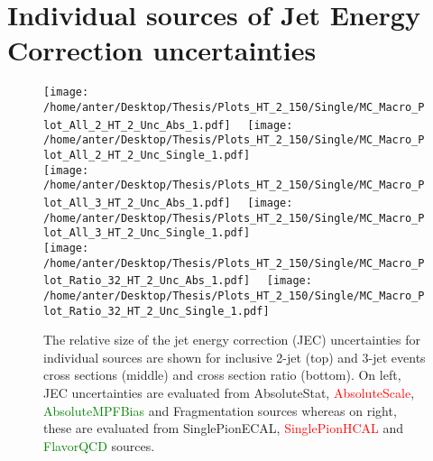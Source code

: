\section{Individual sources of Jet Energy Correction uncertainties}
\label{sec:JECs}

\begin{figure}[!hbtp]
\hspace*{-5mm}\texttt{[image: /home/anter/Desktop/Thesis/Plots\_HT\_2\_150/Single/MC\_Macro\_Plot\_All\_2\_HT\_2\_Unc\_Abs\_1.pdf]}%
~~\texttt{[image: /home/anter/Desktop/Thesis/Plots\_HT\_2\_150/Single/MC\_Macro\_Plot\_All\_2\_HT\_2\_Unc\_Single\_1.pdf]}\\
\hspace*{-5mm}\texttt{[image: /home/anter/Desktop/Thesis/Plots\_HT\_2\_150/Single/MC\_Macro\_Plot\_All\_3\_HT\_2\_Unc\_Abs\_1.pdf]}%
~~\texttt{[image: /home/anter/Desktop/Thesis/Plots\_HT\_2\_150/Single/MC\_Macro\_Plot\_All\_3\_HT\_2\_Unc\_Single\_1.pdf]}\\
\hspace*{-5mm}\texttt{[image: /home/anter/Desktop/Thesis/Plots\_HT\_2\_150/Single/MC\_Macro\_Plot\_Ratio\_32\_HT\_2\_Unc\_Abs\_1.pdf]}%
~~\texttt{[image: /home/anter/Desktop/Thesis/Plots\_HT\_2\_150/Single/MC\_Macro\_Plot\_Ratio\_32\_HT\_2\_Unc\_Single\_1.pdf]}\\
\caption{The relative size of the jet energy correction (JEC) uncertainties for individual sources are shown for inclusive 2-jet (top) and 3-jet events cross sections (middle) and cross section ratio \ratio (bottom). On left, JEC uncertainties are evaluated from \textcolor{blue2}{AbsoluteStat}, \textcolor{red}{AbsoluteScale}, \textcolor{green}{AbsoluteMPFBias} and \textcolor{pink2}{Fragmentation} sources whereas on right, these are evaluated from \textcolor{blue2}{SinglePionECAL}, \textcolor{red}{SinglePionHCAL} and \textcolor{green}{FlavorQCD} sources.}
\label{fig:jes1}
\end{figure}

